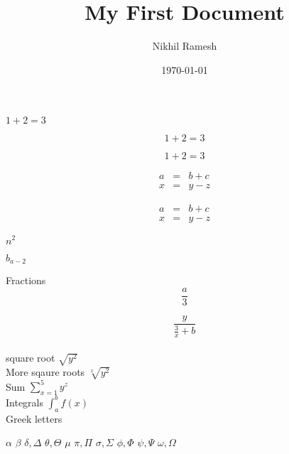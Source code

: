 \documentclass[a4paper,12pt]{article}
\begin{document}
\title{My First Document}
\author{Nikhil Ramesh}
\date{\today}
\maketitle


$1+2=3$


$$1+2=3$$


\begin{equation}1+2=3\end{equation}


\begin{eqnarray}
a & = & b + c \\
x & = & y - z
\end{eqnarray}


\begin{eqnarray*}
a & = & b + c \\
x & = & y - z
\end{eqnarray*}



$n^2$



$b_{a-2}$



Fractions 
$$\frac{a}{3}$$

$$\frac{y}{\frac{3}{x}+b}$$\\


square root $\sqrt{y^2}$\\

More sqaure roots 
$\sqrt[x]{y^2}$ \\


Sum  $\sum_{x=1}^5 y^z$ \\

Integrals $\int_a^b f(x)$ \\


  Greek letters
  
  $\alpha$
  $\beta$
  $\delta, \Delta$
  $\theta, \Theta$
  $\mu$
  $\pi, \Pi$
  $\sigma, \Sigma$
  $\phi, \Phi$
  $\psi, \Psi$
  $\omega, \Omega$
\end{document}
